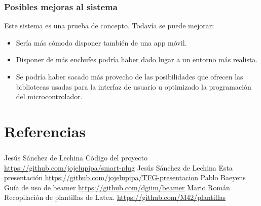 \documentclass[compress, aspectratio=169]{beamer} %
\begin{document}
\begin{frame}
  \transdissolve[duration=1]
  \frametitle{Posibles mejoras al sistema}

  Este sistema es una prueba de concepto. Todavía se puede mejorar:

  \begin{itemize}
  \item{Sería más cómodo disponer también de una app móvil.}
  \item{Disponer de más enchufes podría haber dado lugar a un entorno
    más realista.}
  \item{Se podría haber sacado más provecho de las posibilidades que
    ofrecen las bibliotecas usadas para la interfaz de usuario u
    optimizado la programación del microcontrolador.}
  \end{itemize}
\end{frame}

\section{Referencias}

\begin{frame}
  \transdissolve[duration=1]
  \frametitle{\insertsubsection}
  \tableofcontents[currentsection]
\end{frame}

\begin{frame}
  \transdissolve[duration=1]
  
  \frametitle{\insertsection}
    
  \footnotesize{
    \begin{thebibliography}{7} %
     Jesús Sánchez de Lechina
      \newblock Código del proyecto
      \newblock \url{https://github.com/jojelupipa/smart-plug}
     Jesús Sánchez de Lechina
      \newblock Esta presentación
      \newblock \url{https://github.com/jojelupipa/TFG-presentacion}
     Pablo Baeyens
      \newblock Guía de uso de beamer
      \newblock \url{https://github.com/dgiim/beamer}
     Mario Román
      \newblock Recopilación de plantillas de Latex.
      \newblock \url{https://github.com/M42/plantillas}
    \end{thebibliography}
  }
\end{frame}
\end{document}
